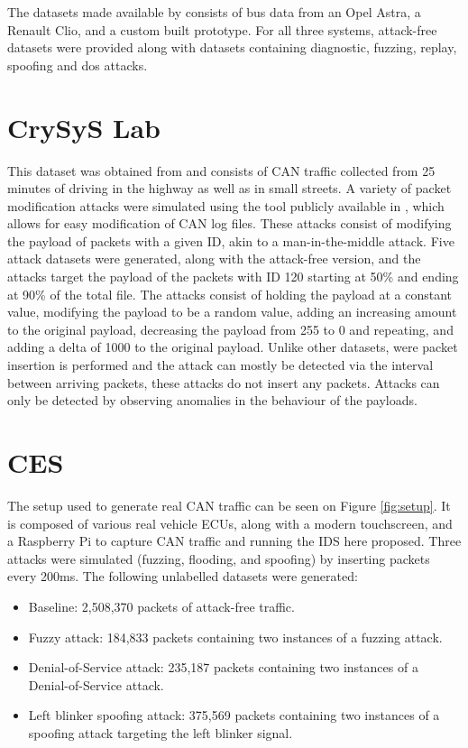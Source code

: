 The datasets made available by \cite{Dupont2019} consists of bus data from an Opel Astra, a Renault Clio, and a custom built prototype. For all three systems, attack-free datasets were provided along with datasets containing diagnostic, fuzzing, replay, spoofing and \gls{dos} attacks.

\section{CrySyS Lab}
\label{sec:dataset_crysys}

This dataset was obtained from \cite*{crysys} and consists of CAN traffic collected from 25 minutes of driving in the highway as well as in small streets. A variety of packet modification attacks were simulated using the tool publicly available in \cite*{infector}, which allows for easy modification of CAN log files. These attacks consist of modifying the payload of packets with a given ID, akin to a man-in-the-middle attack. Five attack datasets were generated, along with the attack-free version, and the attacks target the payload of the packets with ID 120 starting at 50\% and ending at 90\% of the total file. The attacks consist of holding the payload at a constant value, modifying the payload to be a random value, adding an increasing amount to the original payload, decreasing the payload from 255 to 0 and repeating, and adding a delta of 1000 to the original payload. Unlike other datasets, were packet insertion is performed and the attack can mostly be detected via the interval between arriving packets, these attacks do not insert any packets. Attacks can only be detected by observing anomalies in the behaviour of the payloads.

\section{CES}

The setup used to generate real CAN traffic can be seen on Figure \ref{fig:setup}. It is composed of various real vehicle ECUs, along with a modern touchscreen, and a Raspberry Pi to capture CAN traffic and running the IDS here proposed. Three attacks were simulated (fuzzing, flooding, and spoofing) by inserting packets every 200ms. The following unlabelled datasets were generated:

\begin{itemize}
    \item Baseline: 2,508,370 packets of attack-free traffic.
    \item Fuzzy attack: 184,833 packets containing two instances of a fuzzing attack.
    \item Denial-of-Service attack: 235,187 packets containing two instances of a Denial-of-Service attack.
    \item Left blinker spoofing attack: 375,569 packets containing two instances of a spoofing attack targeting the left blinker signal.
\end{itemize}

